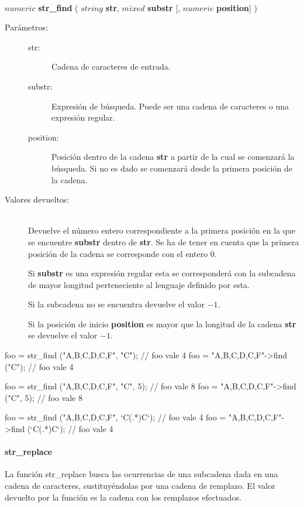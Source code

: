 \begin{framed}
\hfill \\ $numeric$ \textbf{str\_find} ( $string$ \textbf{str}, $mixed$ \textbf{substr} [, $numeric$ \textbf{position}] )  
\begin{description}
\item [Parámetros:] \hfill 
   \begin{description}
   \item[str:] Cadena de caracteres de entrada.
   \item[substr:] Expresión de búsqueda. Puede ser una cadena de caracteres o una expresión regular.  
   \item[position:] Posición dentro de la cadena \textbf{str} a partir de la cual se comenzará la búsqueda. Si no es dado 
   se comenzará desde la primera posición de la cadena.
   \end{description}
\item[Valores devueltos:] \hfill \\
   Devuelve el número entero correspondiente a la primera posición en la que se encuentre \textbf{substr} dentro de \textbf{str}. 
   Se ha de tener en cuenta que la primera posición de la cadena se corresponde con el entero $0$.
   
   Si \textbf{substr} es una expresión regular esta se corresponderá con la subcadena de mayor longitud perteneciente al 
   lenguaje definido por esta. 
   
   Si la subcadena no se encuentra devuelve el valor $-1$. 
   
   Si la posición de inicio \textbf{position} es mayor que la longitud de la cadena \textbf{str} se devuelve el valor $-1$. 
\end{description}
\end{framed}

\begin{myverbatim}
   foo = str_find ("A,B,C,D,C,F", "C"); // foo vale 4  
   foo = "A,B,C,D,C,F"->find ("C"); // foo vale 4

   foo = str_find ("A,B,C,D,C,F", "C", 5); // foo vale 8 
   foo = "A,B,C,D,C,F"->find ("C", 5); // foo vale 8
   
   foo = str_find ("A,B,C,D,C,F", `C(.*)C`); // foo vale 4
   foo = "A,B,C,D,C,F"->find (`C(.*)C`); // foo vale 4
\end{myverbatim}


\paragraph {str\_replace}
La función str\_replace busca las ocurrencias de una subcadena dada en una cadena de caracteres, sustituyéndolas
por una cadena de remplazo. El valor devuelto por la función es la cadena con los remplazos efectuados. \\

